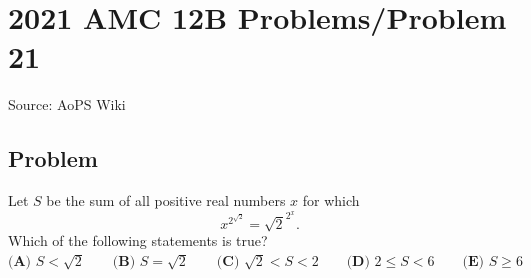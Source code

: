 \documentclass[12pt]{article}
\begin{document}
\section*{{2021 AMC 12B Problems/Problem 21}}
Source: AoPS Wiki

\subsection*{Problem}
Let $S$ be the sum of all positive real numbers $x$ for which \[x^{2^{\sqrt2}}=\sqrt2^{2^x}.\] Which of the following statements is true? $\textbf{(A) }S<\sqrt2 \qquad \textbf{(B) }S=\sqrt2 \qquad \textbf{(C) }\sqrt2<S<2\qquad \textbf{(D) }2\le S<6 \qquad \textbf{(E) }S\ge 6$
\end{document}
